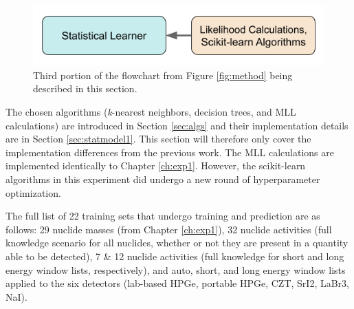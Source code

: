 
\begin{figure}[H]
  \centering
  \includegraphics[width=0.7\linewidth]{./chapters/exp1/methodology3.png}
  \caption{Third portion of the flowchart from Figure \ref{fig:method} being 
           described in this section.}
\end{figure}

The chosen algorithms (\textit{k}-nearest neighbors, decision trees, and
\gls{MLL} calculations) are introduced in Section \ref{sec:algs} and their
implementation details are in Section \ref{sec:statmodel1}.  This section will
therefore only cover the implementation differences from the previous work.
The \gls{MLL} calculations are implemented identically to Chapter
\ref{ch:exp1}.  However, the scikit-learn algorithms in this experiment did
undergo a new round of hyperparameter optimization.

The full list of 22 training sets that undergo training and prediction are as
follows: 29 nuclide masses (from Chapter \ref{ch:exp1}), 32 nuclide activities
(full knowledge scenario for all nuclides, whether or not they are present in a
quantity able to be detected), 7 \& 12 nuclide activities (full knowledge for
short and long energy window lists, respectively), and auto, short, and long
energy window lists applied to the six detectors (lab-based \gls{HPGe},
portable \gls{HPGe}, \gls{CZT}, \gls{SrI2}, \gls{LaBr3}, \gls{NaI}). 

